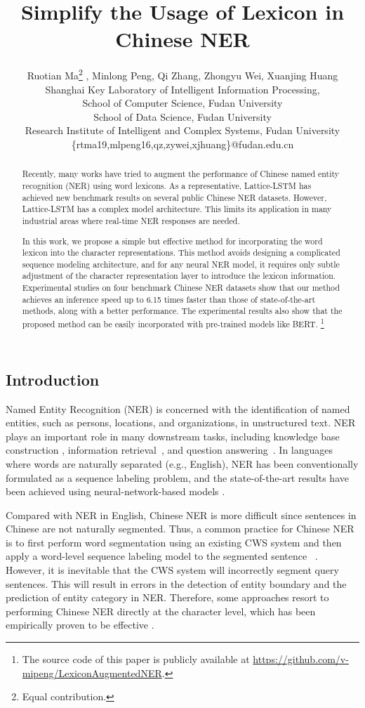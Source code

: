 \documentclass[11pt,a4paper]{article}
\title{Simplify the Usage of Lexicon in Chinese NER}
\author{Ruotian Ma\thanks{{ }{ }Equal contribution.}{ }{ }, Minlong Peng, Qi Zhang, Zhongyu Wei, Xuanjing Huang\\
Shanghai Key Laboratory of Intelligent Information Processing, \\
School of Computer Science, Fudan University\\
School of Data Science, Fudan University\\
Research Institute of Intelligent and Complex Systems,
Fudan University\\
\{rtma19,mlpeng16,qz,zywei,xjhuang\}@fudan.edu.cn}
\date{}
\begin{document}
\begin{CJK}{UTF8}{gbsn}
\maketitle
\begin{abstract}
Recently, many works have tried to augment the performance of Chinese named entity recognition (NER) using word lexicons. As a representative, Lattice-LSTM \cite{zhang2018chinese} has achieved new benchmark results on several public Chinese NER datasets. However, Lattice-LSTM has a complex model architecture. This limits its application in many industrial areas where real-time NER responses are needed. 

In this work, we propose a simple but effective method for incorporating the word lexicon into the character representations. This method avoids designing a complicated sequence modeling architecture, and for any neural NER model, it requires only subtle adjustment of the character representation layer to introduce the lexicon information. Experimental studies on four benchmark Chinese NER datasets show that our method achieves an inference speed up to 6.15 times faster than those of state-of-the-art methods, along with a better performance. The experimental results also show that the proposed method can be easily incorporated with pre-trained models like BERT. \footnote{The source code of this paper is publicly available at \url{https://github.com/v-mipeng/LexiconAugmentedNER}.}\end{abstract}


\section{Introduction}

Named Entity Recognition (NER) is concerned with the identification of named entities, such as persons, locations, and organizations, in unstructured text. 
NER plays an important role in many downstream tasks, including knowledge base construction \cite{riedel2013relation}, information retrieval~\cite{chen2015event}, and question answering~\cite{diefenbach2018core}.
In languages where words are naturally separated (e.g., English), NER has been conventionally formulated as a sequence labeling problem, and the state-of-the-art results have been achieved using neural-network-based models \cite{huang2015bidirectional,chiu2016named,Liu18ner}.

Compared with NER in English, Chinese NER is more difficult since sentences in Chinese are not naturally segmented. Thus, a common practice for Chinese NER is to first perform word segmentation using an existing CWS system and then apply a word-level sequence labeling model to the segmented sentence ~\cite{yang2016combining,he2017unified}. However, it is inevitable that the CWS system will incorrectly segment query sentences. This will result in errors in the detection of entity boundary and the prediction of entity category in NER.
Therefore, some approaches resort to performing Chinese NER directly at the character level, which has been empirically proven to be effective \cite{he2008chinese,liu2010chinese,li2014comparison, liu2019encoding, sui2019leverage, gui2019lexicon, ding2019neural}.


\end{CJK}
\end{document}

